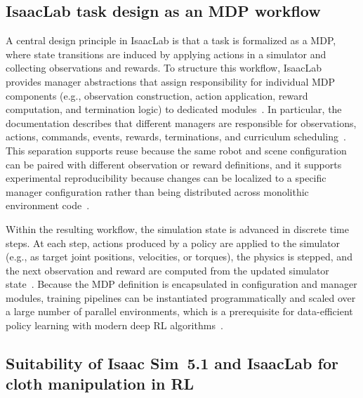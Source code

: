 \subsection{IsaacLab task design as an MDP workflow}
A central design principle in IsaacLab is that a task is formalized as a \ac{MDP}, where state transitions are induced by applying actions in a simulator and collecting observations and rewards.
To structure this workflow, IsaacLab provides manager abstractions that assign responsibility for individual \ac{MDP} components (e.g., observation construction, action application, reward computation, and termination logic) to dedicated modules~\cite{isaaclab_mdp_api}.
In particular, the documentation describes that different managers are responsible for observations, actions, commands, events, rewards, terminations, and curriculum scheduling~\cite{isaaclab_mdp_api}.
This separation supports reuse because the same robot and scene configuration can be paired with different observation or reward definitions, and it supports experimental reproducibility because changes can be localized to a specific manager configuration rather than being distributed across monolithic environment code~\cite{isaaclab_mdp_api}.

Within the resulting workflow, the simulation state is advanced in discrete time steps.
At each step, actions produced by a policy are applied to the simulator (e.g., as target joint positions, velocities, or torques), the physics is stepped, and the next observation and reward are computed from the updated simulator state~\cite{isaaclab_mdp_api}.
Because the \ac{MDP} definition is encapsulated in configuration and manager modules, training pipelines can be instantiated programmatically and scaled over a large number of parallel environments, which is a prerequisite for data-efficient policy learning with modern deep \ac{RL} algorithms~\cite{Makoviychuk2021IsaacGym,isaac_sim_510_physics_fundamentals}.

\subsection{Suitability of Isaac Sim~5.1 and IsaacLab for cloth manipulation in RL}

